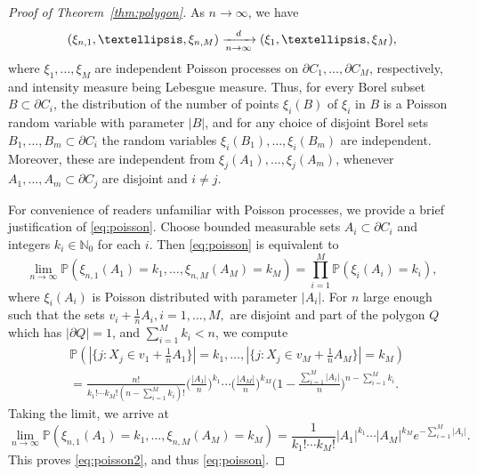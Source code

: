 \documentclass[a4paper,12pt]{article}
\theoremstyle{definition}
\newcommand{\IN}{\mathbb{N}}
\newcommand{\IP}{\mathbb{P}}
\begin{document}
\begin{proof}[Proof of Theorem~\ref{thm:polygon}]
As $n\to\infty$, we have 
\begin{equation} \label{eq:poisson}
(\xi_{n,1},\dots,\xi_{n,M})
\xrightarrow[n\to\infty]{\rm d} (\xi_{1},\dots,\xi_{M}),
\end{equation}
where $\xi_1,\dots,\xi_M$ are independent Poisson processes on $\partial C_1,\dots,\partial C_M$, respectively, and intensity measure being Lebesgue measure. Thus, for every Borel subset $B\subset \partial C_i$, the distribution of the number of points $\xi_i(B)$ of $\xi_i$ in $B$ is a Poisson random variable with parameter $|B|$, and for any choice of disjoint Borel sets $B_1,\dots,B_m\subset \partial C_i$ the random variables $\xi_i(B_1),\dots,\xi_i(B_m)$ are independent. Moreover, these are independent from $\xi_j(A_1),\dots,\xi_j(A_m)$, whenever $A_1,\dots,A_m\subset \partial C_j$ are disjoint and $i\neq j$.

For convenience of readers unfamiliar with Poisson processes, we provide a brief justification of \eqref{eq:poisson}. Choose bounded measurable sets $A_i\subset \partial C_i$ and integers $k_i\in\IN_0$ for each $i$. Then \eqref{eq:poisson} is equivalent to 
\begin{equation} \label{eq:poisson2}
	\lim_{n\to\infty}\IP(\xi_{n,1}(A_1)=k_1,\dots,\xi_{n,M}(A_M)=k_M)
=\prod_{i=1}^M\IP(\xi_{i}(A_i)=k_i),
\end{equation}
where $\xi_i(A_i)$ is Poisson distributed with parameter $|A_i|$. For $n$ large enough such that the sets $v_i+\frac{1}{n}A_i, i=1,\dots,M,$ are disjoint and part of the polygon $Q$ which has $|\partial Q|=1$, and $\sum_{i=1}^{M}k_i<n$, we compute 
\begin{align*}
&\IP(|\{j\colon X_j\in v_1+\frac{1}{n}A_1\}|=k_1,\dots,|\{j\colon X_j\in v_M+\frac{1}{n}A_M\}|=k_M)\\
&=\frac{n!}{k_1!\cdots k_M!(n-\sum_{i=1}^{M}k_i)!}\Big(\frac{|A_1|}{n}\Big)^{k_1}\cdots\Big(\frac{|A_M|}{n}\Big)^{k_M}\Big(1-\frac{\sum_{i=1}^{M}|A_i|}{n}\Big)^{n-\sum_{i=1}^{M}k_i}.
\end{align*}
Taking the limit, we arrive at
\[
\lim_{n\to\infty} \IP(\xi_{n,1}(A_1)=k_1,\dots,\xi_{n,M}(A_M)=k_M)
=\frac{1}{k_1!\cdots k_M!}|A_1|^{k_1}\cdots |A_M|^{k_M} e^{-\sum_{i=1}^{M}|A_i|}.
\]
This proves \eqref{eq:poisson2}, and thus \eqref{eq:poisson}. 



\end{proof}
\end{document}

